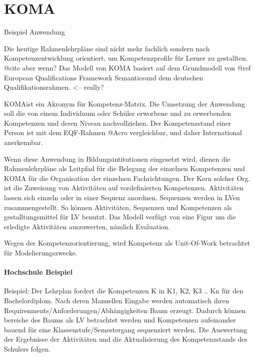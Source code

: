 \documentclass[
12pt,
english,
ngerman,
headsepline,
twoside,
openright,
numbers=noenddot,version=first
]{scrreprt}
\begin{document}



\section{KOMA}{Beispiel Anwendung}
\label{sec:KOMA}

Die heutige Rahmenlehrpläne sind nicht mehr fachlich sondern nach Kompetenzentwicklung orientiert, um Kompetenzprofile für Lerner zu gestallten. @cite aber wenn?
Das Modell von KOMA basiert auf dem Grundmodell von
@ref \glqq European Qualifications Framework Semantics\grqq und dem deutschen Qualifikationsrahmen. <-- really?

\glqq KOMA\grqq ist ein Akronym für Kompetenz-Matrix. Die Umsetzung der Anwendung soll die von einem Individuum oder Schüler
erworbene und zu erwerbenden Kompetenzen und deren Niveau nachvollziehen.
Der Kompetenzstand einer Person ist mit dem EQF-Rahmen @Acro vergleichbar, und daher International anerkennbar.

Wenn diese Anwendung in Bildungsintitutionen eingesetzt wird, dienen die Rahmenlehrpläne als Leitpfad für die Belegung der einzelnen Kompetenzen
und KOMA für die Organisation der einzelnen Fachrichtungen. Der Kern solcher Org. ist die Zuweisung von Aktivitäten auf vordefinierten Kompetenzen.
Aktivitäten lassen sich einzeln oder in einer Sequenz anordnen. Sequenzen werden in LVen zusammengestellt. So können Aktivitäten, Sequenzen und Kompetenzen
als gestalltungsmittel für LV benutzt. Das Modell verfügt von eine Figur um die erledigte Aktivitäten auszuwerten, nämlich Evaluation.

Wegen der Kompetenzorientierung, wird Kompetenz als Unit-Of-Work betrachtet für Modelierungszwecke.

\paragraph{Hochschule Beispiel}
Beispiel:
Der Lehrplan fordert die Kompetenzen K in K1, K2, K3 .. Kn für den Bachelordiplom. Nach deren Manuellen Eingabe werden automatisch
ihren Requirenments/Anforderungen/Abhängigkeiten Baum erzeugt. Dadurch können bereiche des Baums als LV betrachtet werden und Kompetenzen aufeinander
bauend für eine Klassenstufe/Semestergang sequenziert werden. Die Auswertung der Ergebnisse der Aktivitäten und die Aktualisierung des Kompetenzstands
des Schulers folgen.
\end{document}
